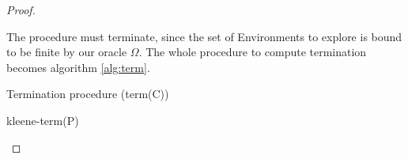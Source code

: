 \begin{theorem}
\begin{proof}
\begin{itemize}
      The procedure must terminate, since the set of Environments to
      explore is bound to be finite by our oracle \(\Omega\).  The
      whole procedure to compute termination becomes algorithm
      \ref{alg:term}.
      \begin{algorithm}
        \caption{Termination procedure (term(C))}\label{alg:term}
        \begin{algorithmic}
          \State \Return kleene-term(P)
          \EndIf
          \State {}
        \end{algorithmic}
      \end{algorithm}
    \end{itemize}
  \end{proof}
\end{theorem}
